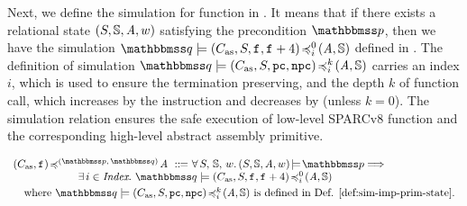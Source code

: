 Next, we define the simulation for function in
\Def{\ref{def:simfunc}}. It means that if there
exists a relational state $(S, \mathbb{S}, \textit{A}, w)$
satisfying the precondition $\relastP$, then we have
the simulation
$\simFunctionSt{\relastQ}{(\asmimp, \state, \lab{}, \lab{} + 4)}
    {i}{0}{(\primcom, \hpstate)}$ defined in
\Def{\ref{def:sim-imp-prim-state}}.
The definition of simulation
$\simFunctionSt{\relastQ}{(\asmimp, \state, \pc, \npc)}
    {i}{k}{(\primcom, \hpstate)}$ carries an index $i$,
which is used to ensure the termination preserving,
and the depth $k$ of function call, which
increases by the \call{} instruction
and decreases by \retl{} (unless $k=0$).
The simulation relation ensures
the safe execution of low-level SPARCv8 function
and the corresponding high-level abstract assembly primitive.

\begin{definition}
    \em
    \label{def:simfunc}
    \small
    \[
        \begin{array}{l}
            \simFunction{(\asmimp, \lab{})}
                {(\relastP, \, \relastQ)}{\primcom}
            \ \define \
            \forall \, \state, \, \hpstate, \, \word. \,
            \asrtmodel{(\state, \hpstate, \primcom, \word)}{\relastP}
            \Longrightarrow \\
            \hspace*{6em}
            \exists \, i \in \Index. \
            \simFunctionSt{\relastQ}{(\asmimp, \state, \lab{}, \lab{}+4)}
                {i}{0}{(\primcom, \hpstate)} \\
            \\[-9pt]
            \hspace*{1em}
            \text{where }
            \simFunctionSt{\relastQ}{(\asmimp, \state, \pc, \npc)}
                {i}{k}{(\primcom, \hpstate)}
            \TYPE{ is defined in
            \Def{\ref{def:sim-imp-prim-state}}}.
        \end{array}
    \]
\end{definition}

